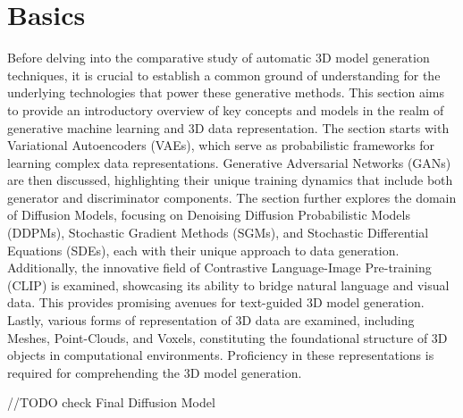 \chapter{Basics}
\label{ch:basics}

Before delving into the comparative study of automatic 3D model generation techniques, it is crucial to establish a common ground of understanding for the underlying technologies that power these generative methods. This section aims to provide an introductory overview of key concepts and models in the realm of generative machine learning and 3D data representation. The section starts with Variational Autoencoders (VAEs), which serve as probabilistic frameworks for learning complex data representations. Generative Adversarial Networks (GANs) are then discussed, highlighting their unique training dynamics that include both generator and discriminator components. The section further explores the domain of Diffusion Models, focusing on Denoising Diffusion Probabilistic Models (DDPMs), Stochastic Gradient Methods (SGMs), and Stochastic Differential Equations (SDEs), each with their unique approach to data generation. Additionally, the innovative field of Contrastive Language-Image Pre-training (CLIP) is examined, showcasing its ability to bridge natural language and visual data. This provides promising avenues for text-guided 3D model generation. Lastly, various forms of representation of 3D data are examined, including Meshes, Point-Clouds, and Voxels, constituting the foundational structure of 3D objects in computational environments. Proficiency in these representations is required for comprehending the 3D model generation.

//TODO check Final Diffusion Model






